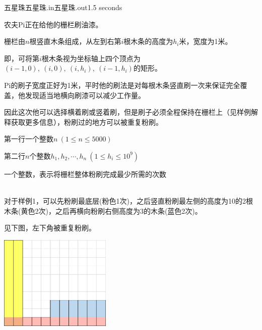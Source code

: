 \begin{problem}{五星珠}{五星珠.in}{五星珠.out}{1.5 seconds}


农夫Pi正在给他的栅栏刷油漆。

栅栏由$n$根竖直木条组成，从左到右第$i$根木条的高度为$h_i$米，宽度为1米。

即，可将第$i$根木条视为坐标轴上四个顶点为$(i-1,0),\ (i,0),\ (i,h_i),\ (i-1,h_i)$的矩形。

Pi的刷子宽度正好为1米，平时他的刷法是对每根木条竖直刷一次来保证完全覆盖，他发现适当地横向刷漆可以减少工作量。

因此这次他可以选择横着刷或竖着刷，但是刷子必须全程保持在栅栏上（见样例解释获取更多信息），粉刷过的地方可以被重复粉刷。

\InputFile

第一行一个整数$n\ (1\le n\le 5000)$

第二行$n$个整数$h_1,h_2,\cdots,h_n\ (1\le h_i\le 10^9)$

\OutputFile

一个整数，表示将栅栏整体粉刷完成最少所需的次数

\Example

\begin{example}
%
%
\end{example}
\\
对于样例1，可以先粉刷最底层(粉色1次)，之后竖直粉刷最左侧的高度为10的2根木条(黄色2次)，之后再横向粉刷右侧高度为3的木条(蓝色2次)。

见下图，左下角被重复粉刷。
\begin{center}
\includegraphics[width=0.4\textwidth]{pics/E.png}
\end{center}
\end{problem}
